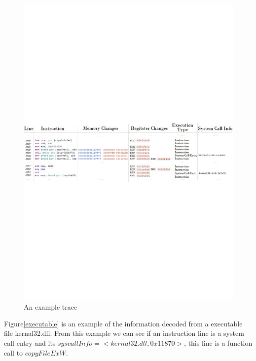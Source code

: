 \begin{figure}[H]
\centerline{\includegraphics[scale=0.45]{Figures/trace}}
\caption{An example trace }
\label{trace}
\end{figure}

Figure\ref{executable} is an example of the information decoded from a executable file kernal32.dll. From this example we can see if an instruction line is a system call entry and its $syscallInfo = <kernal32.dll, 0x11870>$, this line is a function call to $copyFileExW$.

